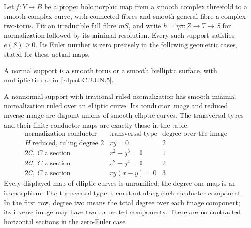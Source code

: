 \begin{proposition}\label{cdp:st:C.2.UN.12}

Let $f:Y\to B$ be a proper holomorphic map from a smooth
complex threefold to a smooth complex curve, with connected
fibres and smooth general fibre a complex two-torus. Fix an
irreducible full fibre $mS$, and write
$h=\eta\pi:Z\to T\to S$ for normalization followed by its
minimal resolution. Every such support satisfies $e(S)\ge0$.
Its Euler number is zero precisely in the following geometric
cases, stated for these actual maps.

A normal support is a smooth torus or a smooth bielliptic
surface, with multiplicities as in \ref{cdp:st:C.2.UN.5}.

A nonnormal support with irrational ruled normalization has
smooth minimal normalization ruled over an elliptic curve.
Its conductor image and reduced inverse image are disjoint
unions of smooth elliptic curves. The transversal types and
their finite conductor maps are exactly those in the table:
\[
\begin{array}{c|c|c}
 \text{normalization conductor}&\text{transversal type}
       &\text{degree over the image}\\ \hline
 H\text{ reduced, ruling degree }2&xy=0&2\\
 2C,\ C\text{ a section}&x^2-y^3=0&1\\
 2C,\ C\text{ a section}&x^2-y^4=0&2\\
 2C,\ C\text{ a section}&xy(x-y)=0&3
\end{array}                                                   \tag{C.IZ.1}\label{cdp:eq:C.IZ.1}
\]
Every displayed map of elliptic curves is unramified; the
degree-one map is an isomorphism. The transversal type is
constant along each conductor component. In the first row,
degree two means the total degree over each image component;
its inverse image may have two connected components. There are no
contracted horizontal sections in the zero-Euler case.


\end{proposition}
